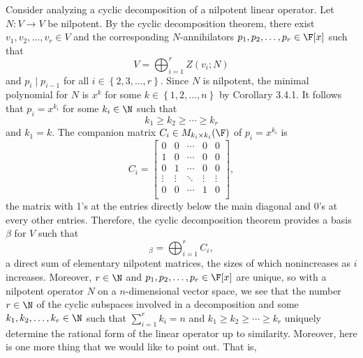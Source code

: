 \documentclass[linearalgebraII]{subfiles}
\begin{document}
    \begin{remark}
        Consider analyzing a cyclic decomposition of a nilpotent linear operator. Let $N:V\to V$ be nilpotent. By the cyclic decomposition theorem, there exist $v_1, v_2, \ldots,v_r\in V$ and the corresponding $N$-annihilators $p_1,p_2,\ldots,p_r\in\F[x]$ such that
        \begin{equation*}
            V = \bigoplus^{r}_{i=1} Z\left( v_i;N \right) 
        \end{equation*}
        and $p_i\mid p_{i-1}$ for all $i\in \left\lbrace 2,3,\ldots,r \right\rbrace$. Since $N$ is nilpotent, the minimal polynomial for $N$ is $x^k$ for some $k\in \left\lbrace 1,2,\ldots,n \right\rbrace$ by Corollary 3.4.1. It follows that $p_i = x^{k_i}$ for some $k_i\in\N$ such that
        \begin{equation*}
            k_1\geq k_2\geq\cdots\geq k_r
        \end{equation*}
        and $k_1=k$. The companion matrix $C_i\in M_{k_i\times k_i}(\F)$ of $p_i=x^{k_i}$ is
        \begin{equation*}
            C_i = 
            \begin{bmatrix}
                0 & 0 & \cdots & 0 & 0 \\
                1 & 0 & \cdots & 0 & 0 \\
                0 & 1 & \cdots & 0 & 0 \\
                \vdots & \vdots & \ddots & \vdots & \vdots \\
                0 & 0 & \cdots & 1 & 0 \\
            \end{bmatrix},
        \end{equation*}
        the matrix with 1's at the entries directly below the main diagonal and 0's at every other entries. Therefore, the cyclic decomposition theorem provides a basis $\beta$ for $V$ such that
        \begin{equation*}
            [N]_\beta = \bigoplus^{r}_{i=1} C_i,
        \end{equation*}
        a direct sum of elementary nilpotent matrices, the sizes of which nonincreases as $i$ increases. Moreover, $r\in\N$ and $p_1,p_2,\ldots,p_r\in\F[x]$ are unique, so with a nilpotent operator $N$ on a $n$-dimensional vector space, we see that the number $r\in\N$ of the cyclic subspaces involved in a decomposition and some $k_1,k_2,\ldots,k_r\in\N$ such that $\sum^{r}_{i=1} k_i=n$ and $k_1\geq k_2\geq \cdots\geq k_r$ uniquely determine the rational form of the linear operator up to similarity. Moreover, here is one more thing that we would like to point out. That is,

\end{remark}
\end{document}
